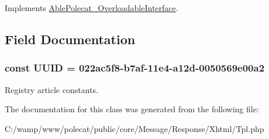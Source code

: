 Implements \hyperlink{interface_able_polecat___overloadable_interface_a94d2e558bba777f54dcc10f1bfc4dca5}{Able\+Polecat\+\_\+\+Overloadable\+Interface}.



\subsection{Field Documentation}
\hypertarget{class_able_polecat___message___response___xhtml___tpl_a74b892c8c0b86bf9d04c5819898c51e7}{}
\subsubsection[{U\+U\+I\+D}]{\setlength{\rightskip}{0pt plus 5cm}const U\+U\+I\+D = \textquotesingle{}022ac5f8-\/b7af-\/11e4-\/a12d-\/0050569e00a2\textquotesingle{}}\label{class_able_polecat___message___response___xhtml___tpl_a74b892c8c0b86bf9d04c5819898c51e7}
Registry article constants. 

The documentation for this class was generated from the following file\+:\begin{DoxyCompactItemize}
\item 
C\+:/wamp/www/polecat/public/core/\+Message/\+Response/\+Xhtml/Tpl.\+php\end{DoxyCompactItemize}
